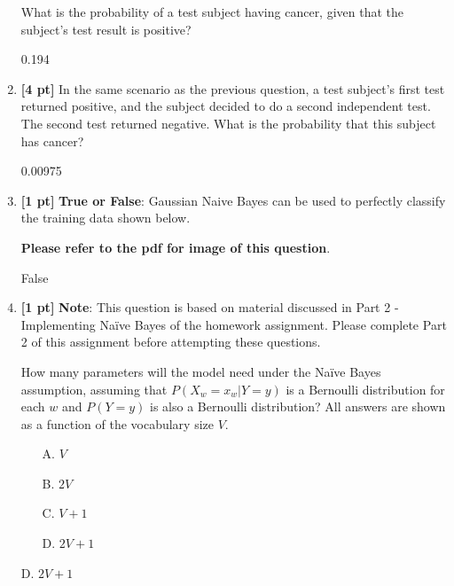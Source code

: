 \documentclass{article}
\begin{document}
\begin{enumerate}
    What is the probability of a test subject having cancer, given that the subject's test result is positive? 
    \begin{tcolorbox}[width=\linewidth/3,height=1.5cm]
    0.194
    \end{tcolorbox}
    
    \item \textbf{[4 pt]} In the same scenario as the previous question, a test subject's first test returned positive, and the subject decided to do a second independent test. The second test returned negative. What is the probability that this subject has cancer?
    \begin{tcolorbox}[width=\linewidth/3,height=1.5cm]
    0.00975
    \end{tcolorbox}
    \newpage
    \item \textbf{[1 pt]} \textbf{True or False}: Gaussian Naive Bayes can be used to perfectly classify the training data shown below.
    \begin{center}
    \vspace{2em}
        \textbf{Please refer to the pdf for image of this question}.
    \vspace{2em}
    \end{center}
    \begin{tcolorbox}[width=\linewidth/3,height=1.5cm]
    False
    \end{tcolorbox}
    
    \item \textbf{[1 pt]} \textbf{Note}: This question is based on material discussed in Part 2 - Implementing Na{\"i}ve Bayes of the homework assignment. Please complete Part 2 of this assignment before attempting these questions.
    
    How many parameters will the model need under the Na{\"i}ve Bayes assumption, assuming that $P(X_w = x_w \vert Y = y)$ is a Bernoulli distribution for each $w$ and $P(Y=y)$ is also a Bernoulli distribution? All answers are shown as a function of the vocabulary size $V$.
    \begin{itemize}
        \item[A.] $V$
        \item[B.] $2V$
        \item[C.] $V+1$
        \item[D.] $2V+1$
    \end{itemize}
    \begin{tcolorbox}[width=\linewidth/3,height=1.5cm]
    D. $2V+1$
    \end{tcolorbox}
    

\end{enumerate}
\end{document}
